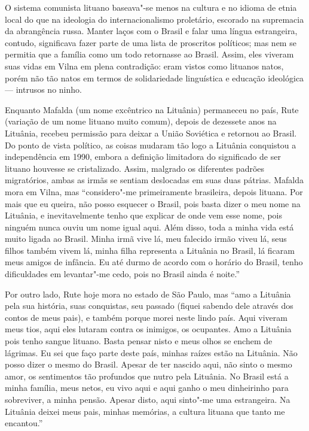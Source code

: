 O sistema comunista lituano
baseava"-se menos na cultura e no idioma de etnia local do que na
ideologia do internacionalismo proletário, escorado na supremacia da
abrangência russa. Manter laços com o Brasil e falar uma língua
estrangeira, contudo, significava fazer parte de uma lista de proscritos
políticos; mas nem se permitia que a família como um todo retornasse ao
Brasil. Assim, eles viveram suas vidas em Vilna em plena contradição:
eram vistos como lituanos natos, porém não tão natos em termos de
solidariedade linguística e educação ideológica --- intrusos no ninho.

Enquanto Mafalda (um nome excêntrico na Lituânia) permaneceu no país, 
Rute (variação de um nome lituano muito comum), depois de
dezessete anos na Lituânia, recebeu permissão para deixar a União
Soviética e retornou ao Brasil. Do ponto de vista político, as coisas
mudaram tão logo a Lituânia conquistou a independência em 1990, embora a
definição limitadora do significado de ser lituano houvesse se
cristalizado. Assim, malgrado os diferentes padrões migratórios, ambas
as irmãs se sentiam deslocadas em suas duas pátrias. Mafalda mora em Vilna, mas
``considero"-me primeiramente brasileira, depois lituana. Por
mais que eu queira, não posso esquecer o Brasil, pois basta dizer o meu
nome na Lituânia, e inevitavelmente tenho que explicar de onde vem esse
nome, pois ninguém nunca ouviu um nome igual aqui. Além disso, toda a
minha vida está muito ligada ao Brasil. Minha irmã vive lá, meu falecido
irmão viveu lá, seus filhos também vivem lá, minha filha representa a
Lituânia no Brasil, lá ficaram meus amigos de infância. Eu até durmo de
acordo com o horário do Brasil, tenho dificuldades em levantar"-me cedo,
pois no Brasil ainda é noite.''

Por outro lado, Rute hoje mora no estado de São Paulo, mas ``amo a Lituânia pela sua história, suas conquistas,
seu passado (fiquei sabendo dele através dos contos de meus pais), e
também porque morei neste lindo país. Aqui viveram meus tios, aqui eles
lutaram contra os inimigos, os ocupantes. Amo a Lituânia pois tenho
sangue lituano. Basta pensar nisto e meus olhos se enchem de lágrimas.
Eu sei que faço parte deste país, minhas raízes estão na Lituânia. Não
posso dizer o mesmo do Brasil. Apesar de ter nascido aqui, não sinto o
mesmo amor, os sentimentos tão profundos que nutro pela Lituânia. No
Brasil está a minha família, meus netos, eu vivo aqui e aqui ganho o meu
dinheirinho para sobreviver, a minha pensão. Apesar disto, aqui
sinto"-me uma estrangeira. Na Lituânia deixei meus pais, minhas memórias,
a cultura lituana que tanto me encantou.''

